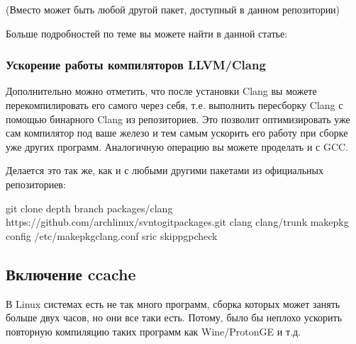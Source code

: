 \documentclass[letterpaper,10pt,russian,openany]{sphinxmanual}
\begin{document}
\sphinxAtStartPar
(Вместо  может быть любой другой пакет, доступный в данном репозитории)

\sphinxAtStartPar
Больше подробностей по теме вы можете найти в данной статье:

\sphinxAtStartPar
{}

\ignorespaces 

\subsubsection{Ускорение работы компиляторов LLVM/Clang}
\label{\detokenize{source/generic-system-acceleration:llvm-clang}}\label{\detokenize{source/generic-system-acceleration:speeding-up-clang-llvm-compilers}}\label{\detokenize{source/generic-system-acceleration:index-2}}
\sphinxAtStartPar
Дополнительно можно отметить, что после установки Clang вы можете перекомпилировать его самого через себя,
т.е. выполнить пересборку Clang с помощью бинарного Clang из репозиториев.
Это позволит оптимизировать уже сам компилятор под ваше железо и тем самым ускорить
его работу при сборке уже других программ. Аналогичную операцию вы можете проделать и с GCC.

\sphinxAtStartPar
Делается это так же, как и с любыми другими пакетами из официальных репозиториев:

\begin{sphinxVerbatim}[commandchars=\\\{\}]
git clone \PYGZhy{}\PYGZhy{}depth  \PYGZhy{}\PYGZhy{}branch packages/clang https://github.com/archlinux/svntogit\PYGZhy{}packages.git clang
 clang/trunk
makepkg \PYGZhy{}\PYGZhy{}config /etc/makepkg\PYGZhy{}clang.conf \PYGZhy{}sric \PYGZhy{}\PYGZhy{}skippgpcheck
\end{sphinxVerbatim}

\ignorespaces 

\subsection{Включение ccache}
\label{\detokenize{source/generic-system-acceleration:ccache}}\label{\detokenize{source/generic-system-acceleration:enabling-ccache}}\label{\detokenize{source/generic-system-acceleration:index-3}}
\sphinxAtStartPar
В Linux системах есть не так много программ, сборка которых может занять больше двух часов,
но они все таки есть. Потому, было бы неплохо ускорить повторную компиляцию таких программ как Wine/Proton\sphinxhyphen{}GE и т.д.
\end{document}
